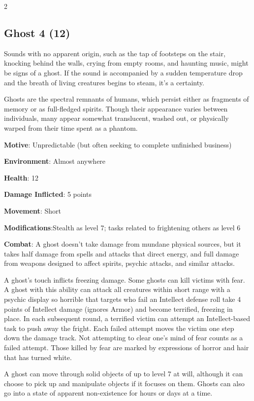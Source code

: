 \begin{multicols}{2}
\subsection{Ghost	4 (12)}

Sounds with no apparent origin, such as the tap of footsteps on the stair, knocking behind the walls, crying from empty rooms, and haunting music, might be signs of a ghost. If the sound is accompanied by a sudden temperature drop and the breath of living creatures begins to steam, it’s a certainty.

Ghosts are the spectral remnants of humans, which persist either as fragments of memory or as full-fledged spirits. Though their appearance varies between individuals, many appear somewhat translucent, washed out, or physically warped from their time spent as a phantom.

\textbf{Motive}: Unpredictable (but often seeking to complete unfinished business)

\textbf{Environment}: Almost anywhere

\textbf{Health}: 12

\textbf{Damage Inflicted}: 5 points

\textbf{Movement}: Short

\textbf{Modifications}:Stealth as level 7; tasks related to frightening others as level 6

\textbf{Combat}: A ghost doesn’t take damage from mundane physical sources, but it takes half damage from spells and attacks that direct energy, and full damage from weapons designed to affect spirits, psychic attacks, and similar attacks.

A ghost’s touch inflicts freezing damage. Some ghosts can kill victims with fear. A ghost with this ability can attack all creatures within short range with a psychic display so horrible that targets who fail an Intellect defense roll take 4 points of Intellect damage (ignores Armor) and become terrified, freezing in place. In each subsequent round, a terrified victim can attempt an Intellect-based task to push away the fright. Each failed attempt moves the victim one step down the damage track. Not attempting to clear one’s mind of fear counts as a failed attempt. Those killed by fear are marked by expressions of horror and hair that has turned white.

A ghost can move through solid objects of up to level 7 at will, although it can choose to pick up and manipulate objects if it focuses on them. Ghosts can also go into a state of apparent non-existence for hours or days at a time.


\end{multicols}
